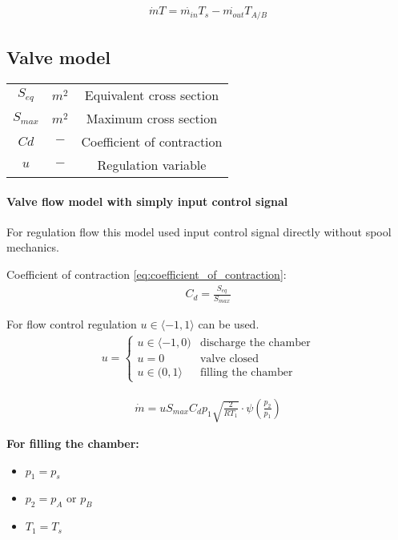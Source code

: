 \begin{align}
    \dot{m}T = \dot{m_{in}}T_s - \dot{m_{out}}T_{A/B}
\end{align}



\subsection{Valve model} 
\begin{tabular}{ |c|c|c| }
    \hline
    $S_{eq}$                & $m^2$         & Equivalent cross section \\
    $S_{max}$               & $m^2$         & Maximum cross section \\
    $Cd$                    & $-$           & Coefficient of contraction \\
    $u$                     & $-$           & Regulation variable \\
    \hline
\end{tabular}

\paragraph{Valve flow model with simply input control signal}
For regulation flow this model used input control signal directly without
spool mechanics.

Coefficient of contraction \ref{eq:coefficient_of_contraction}:
\begin{align}
    C_d = \frac{S_{eq}}{S_{max}}
    \label{eq:coefficient_of_contraction}
\end{align}

For flow control regulation $u \in \langle-1,1\rangle$ can be used.
\begin{align}
    u =
    \begin{cases}
        u \in \langle -1, 0) & \text{discharge the chamber} \\
        u = 0& \text{valve closed}  \\
        u \in (0, 1\rangle & \text{filling the chamber} 
    \end{cases}
\end{align} 

\begin{align}
    \dot{m} = u S_{max} C_d p_1 \sqrt{\frac{2}{RT_1}}
    \cdot \psi\left(\frac{p_2}{p_1}\right)
    \label{eq:flow}
\end{align}

\textbf{For filling the chamber:}
\begin{itemize}
\item $p_1 = p_s$ 
\item $p_2 = p_A \text{ or } p_B$
\item $T_1 = T_s$
\end{itemize}


